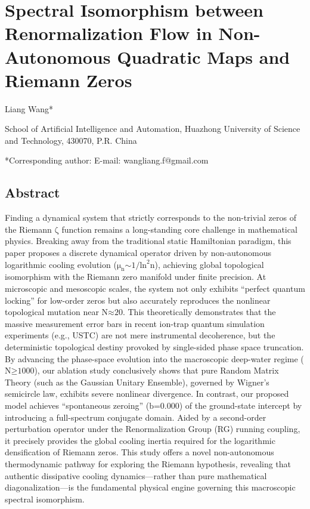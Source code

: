\hypertarget{spectral-isomorphism-between-renormalization-flow-in-non-autonomous-quadratic-maps-and-riemann-zeros}{%
\section{Spectral Isomorphism between Renormalization Flow in
Non-Autonomous Quadratic Maps and Riemann
Zeros}\label{spectral-isomorphism-between-renormalization-flow-in-non-autonomous-quadratic-maps-and-riemann-zeros}}

Liang Wang*

School of Artificial Intelligence and Automation, Huazhong University of
Science and Technology, 430070, P.R. China

*Corresponding author: E-mail: wangliang.f@gmail.com

\hypertarget{abstract}{%
\subsection{\texorpdfstring{\textbf{Abstract}}{Abstract}}\label{abstract}}

Finding a dynamical system that strictly corresponds to the non-trivial
zeros of the Riemann \(\text{ζ}\) function remains a long-standing core
challenge in mathematical physics. Breaking away from the traditional
static Hamiltonian paradigm, this paper proposes a discrete dynamical
operator driven by non-autonomous logarithmic cooling evolution
(\(\text{μ}_{\text{n}}\text{∼1/}\text{ln}^{\text{2}}\text{n}\)),
achieving global topological isomorphism with the Riemann zero manifold
under finite precision. At microscopic and mesoscopic scales, the system
not only exhibits ``perfect quantum locking'' for low-order zeros but
also accurately reproduces the nonlinear topological mutation near
\(\text{N}\text{≈20}\). This theoretically demonstrates that the massive
measurement error bars in recent ion-trap quantum simulation experiments
(e.g., USTC) are not mere instrumental decoherence, but the
deterministic topological destiny provoked by single-sided phase space
truncation. By advancing the phase-space evolution into the macroscopic
deep-water regime (\(\text{N}\text{≥1000}\)), our ablation study
conclusively shows that pure Random Matrix Theory (such as the Gaussian
Unitary Ensemble), governed by Wigner's semicircle law, exhibits severe
nonlinear divergence. In contrast, our proposed model achieves
``spontaneous zeroing'' (\(\text{b}\text{=0.000}\)) of the ground-state
intercept by introducing a full-spectrum conjugate domain. Aided by a
second-order perturbation operator under the Renormalization Group (RG)
running coupling, it precisely provides the global cooling inertia
required for the logarithmic densification of Riemann zeros. This study
offers a novel non-autonomous thermodynamic pathway for exploring the
Riemann hypothesis, revealing that authentic dissipative cooling
dynamics---rather than pure mathematical diagonalization---is the
fundamental physical engine governing this macroscopic spectral
isomorphism.

